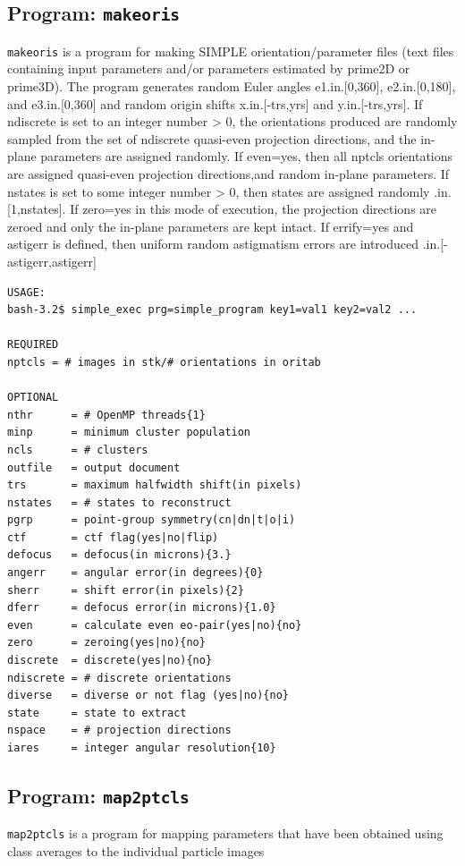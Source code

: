 \documentclass[a4paper,11pt]{article}
\newcommand{\prgname}[1]{\textcolor{NavyBlue}{\texttt{#1}}}
\begin{document}
\subsection{Program: \prgname{makeoris}}
\label{makeoris}
\prgname{makeoris} is a program for making SIMPLE orientation/parameter files (text files containing input parameters and/or parameters estimated by prime2D or prime3D). The program generates random Euler angles e1.in.[0,360], e2.in.[0,180], and e3.in.[0,360] and random origin shifts x.in.[-trs,yrs] and y.in.[-trs,yrs]. If ndiscrete is set to an integer number > 0, the orientations produced are randomly sampled from the set of ndiscrete quasi-even projection directions, and the in-plane parameters are assigned randomly. If even=yes, then all nptcls orientations are assigned quasi-even projection directions,and random in-plane parameters. If nstates is set to some integer number > 0, then states are assigned randomly .in.[1,nstates]. If zero=yes in this mode of execution, the projection directions are zeroed and only the in-plane parameters are kept intact. If errify=yes and astigerr is defined, then uniform random astigmatism errors are introduced .in.[-astigerr,astigerr]

\begin{verbatim}
USAGE:
bash-3.2$ simple_exec prg=simple_program key1=val1 key2=val2 ...

REQUIRED
nptcls = # images in stk/# orientations in oritab

OPTIONAL
nthr      = # OpenMP threads{1}
minp      = minimum cluster population
ncls      = # clusters
outfile   = output document
trs       = maximum halfwidth shift(in pixels)
nstates   = # states to reconstruct
pgrp      = point-group symmetry(cn|dn|t|o|i)
ctf       = ctf flag(yes|no|flip)
defocus   = defocus(in microns){3.}
angerr    = angular error(in degrees){0}
sherr     = shift error(in pixels){2}
dferr     = defocus error(in microns){1.0}
even      = calculate even eo-pair(yes|no){no}
zero      = zeroing(yes|no){no}
discrete  = discrete(yes|no){no}
ndiscrete = # discrete orientations
diverse   = diverse or not flag (yes|no){no}
state     = state to extract
nspace    = # projection directions
iares     = integer angular resolution{10}
\end{verbatim}

\subsection{Program: \prgname{map2ptcls}}
\label{map2ptcls}
\prgname{map2ptcls} is a program for mapping parameters that have been obtained using class averages to the individual particle images
\end{document}
